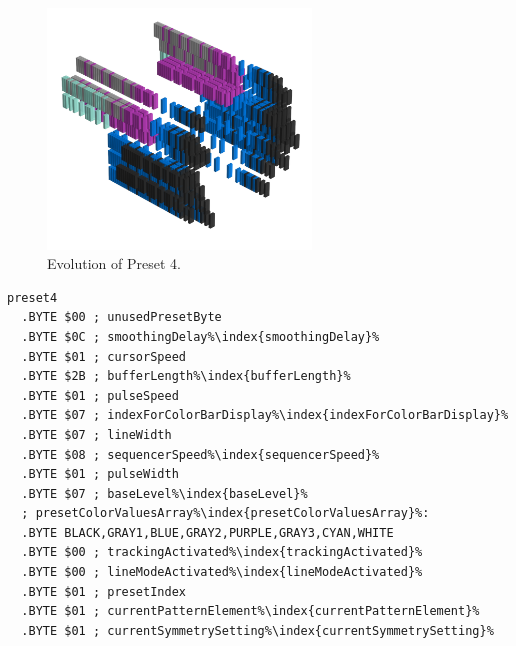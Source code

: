\vspace*{-0.7cm}
\begin{minipage}[b]{0.48\linewidth}
\begin{figure}[H]                                                          
  \centering                                                             
  \begin{adjustbox}{width=7cm,center}                                   
  \includegraphics[width=7cm]{src/presets/pattern4-45.png}%
  \end{adjustbox}                                                        
\caption{Evolution of Preset 4.}                                           
\end{figure}                                                               
\end{minipage}
\hspace{0.1cm}
\begin{minipage}[b]{0.48\linewidth}                            
                                                                           
\begin{lstlisting}[basicstyle=\ttfamily\scriptsize,caption=Data structure for Preset 4.,escapechar=\%]
preset4
  .BYTE $00 ; unusedPresetByte
  .BYTE $0C ; smoothingDelay%\index{smoothingDelay}%
  .BYTE $01 ; cursorSpeed
  .BYTE $2B ; bufferLength%\index{bufferLength}%
  .BYTE $01 ; pulseSpeed
  .BYTE $07 ; indexForColorBarDisplay%\index{indexForColorBarDisplay}%
  .BYTE $07 ; lineWidth
  .BYTE $08 ; sequencerSpeed%\index{sequencerSpeed}%
  .BYTE $01 ; pulseWidth
  .BYTE $07 ; baseLevel%\index{baseLevel}%
  ; presetColorValuesArray%\index{presetColorValuesArray}%: 
  .BYTE BLACK,GRAY1,BLUE,GRAY2,PURPLE,GRAY3,CYAN,WHITE
  .BYTE $00 ; trackingActivated%\index{trackingActivated}%
  .BYTE $00 ; lineModeActivated%\index{lineModeActivated}%
  .BYTE $01 ; presetIndex
  .BYTE $01 ; currentPatternElement%\index{currentPatternElement}%
  .BYTE $01 ; currentSymmetrySetting%\index{currentSymmetrySetting}%
\end{lstlisting}
\end{minipage}
\clearpage

